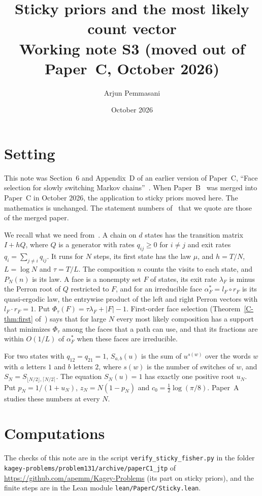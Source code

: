 \documentclass[11pt]{article}
\title{Sticky priors and the most likely count vector\\[4pt]
\large Working note S3 (moved out of Paper~C, October 2026)}
\author{Arjun Pemmasani}
\date{October 2026}
\theoremstyle{definition}
\theoremstyle{remark}
\begin{document}
\maketitle

\section{Setting}\label{sec:setting}

This note was Section~6 and Appendix~D of an earlier version of Paper~C,
``Face selection for slowly switching Markov chains''~\cite{paperC}. When
Paper~B~\cite{paperB} was merged into Paper~C in October 2026, the application
to sticky priors moved here. The mathematics is unchanged. The statement
numbers of~\cite{paperC} that we quote are those of the merged paper.

We recall what we need from~\cite{paperC}. A chain on $d$ states has the
transition matrix $I+hQ$, where $Q$ is a generator with rates $q_{ij}\ge0$ for
$i\ne j$ and exit rates $q_i=\sum_{j\ne i}q_{ij}$. It runs for $N$ steps, its
first state has the law $\mu$, and $h=T/N$, $L=\log N$ and $\tau=T/L$. The
composition $n$ counts the visits to each state, and $P_N(n)$ is its law. A
face is a nonempty set $F$ of states, its exit rate $\lambda_F$ is minus the
Perron root of $Q$ restricted to $F$, and for an irreducible face
$\alpha^*_F=l_F\circ r_F$ is its quasi-ergodic law, the entrywise product of
the left and right Perron vectors with $l_F\cdot r_F=1$. Put
$\Phi_\tau(F)=\tau\lambda_F+|F|-1$. First-order face selection
(Theorem~\ref*{C-thm:first} of~\cite{paperC}) says that for large $N$ every most
likely composition has a support that minimizes $\Phi_\tau$ among the faces that
a path can use, and that its fractions are within $O(1/L)$ of $\alpha^*_F$
when these faces are irreducible.

For two states with $q_{12}=q_{21}=1$, $S_{a,b}(u)$ is the sum of $u^{s(w)}$
over the words $w$ with $a$ letters $1$ and $b$ letters $2$, where $s(w)$ is
the number of switches of $w$, and $S_N=S_{\lfloor N/2\rfloor,\lceil
N/2\rceil}$. The equation $S_N(u)=1$ has exactly one positive root $u_N$. Put
$p_N=1/(1+u_N)$, $z_N=N(1-p_N)$ and $c_0=\frac12\log(\pi/8)$. Paper~A~\cite{paperA}
studies these numbers at every $N$.



\appendix


\section*{Computations}
The checks of this note are in the script \texttt{verify\_sticky\_fisher.py} in the
folder \nolinkurl{kagey-problems/problem131/archive/paperC1_jtp} of
\url{https://github.com/apemm/Kagey-Problems} (its part on sticky priors), and
the finite steps are in the Lean module \nolinkurl{lean/PaperC/Sticky.lean}.
\end{document}
